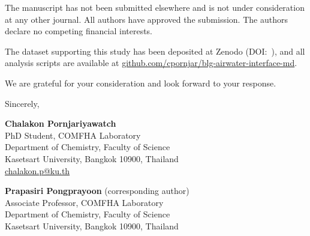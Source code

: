 \documentclass[11pt,a4paper]{article}
\begin{document}
The manuscript has not been submitted elsewhere and is not under consideration
at any other journal. All authors have approved the submission. The authors
declare no competing financial interests.

The dataset supporting this study has been deposited at Zenodo
(DOI:~\href{https://doi.org/\zenododoi}{\zenododoi}), and all analysis scripts
are available at
\href{https://github.com/cpornjar/blg-airwater-interface-md}{github.com/cpornjar/blg-airwater-interface-md}.

We are grateful for your consideration and look forward to your response.

\bigskip

Sincerely,

\bigskip\bigskip

\noindent\textbf{Chalakon Pornjariyawatch}\\
PhD Student, COMFHA Laboratory\\
Department of Chemistry, Faculty of Science\\
Kasetsart University, Bangkok 10900, Thailand\\
\href{mailto:chalakon.p@ku.th}{chalakon.p@ku.th}

\bigskip

\noindent\textbf{Prapasiri Pongprayoon} (corresponding author)\\
Associate Professor, COMFHA Laboratory\\
Department of Chemistry, Faculty of Science\\
Kasetsart University, Bangkok 10900, Thailand
\end{document}
